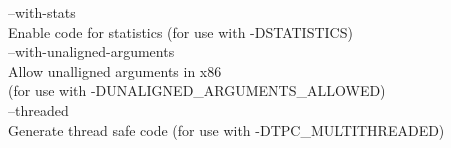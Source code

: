 \documentclass[letterpaper]{article}
\begin{document}
  --with-stats\\
          Enable code for statistics (for use with -DSTATISTICS)\\

  --with-unaligned-arguments\\
          Allow unalligned arguments in x86\\
          (for use with -DUNALIGNED\_ARGUMENTS\_ALLOWED)\\

  --threaded\\
          Generate thread safe code (for use with -DTPC\_MULTITHREADED)\\
\end{document}
